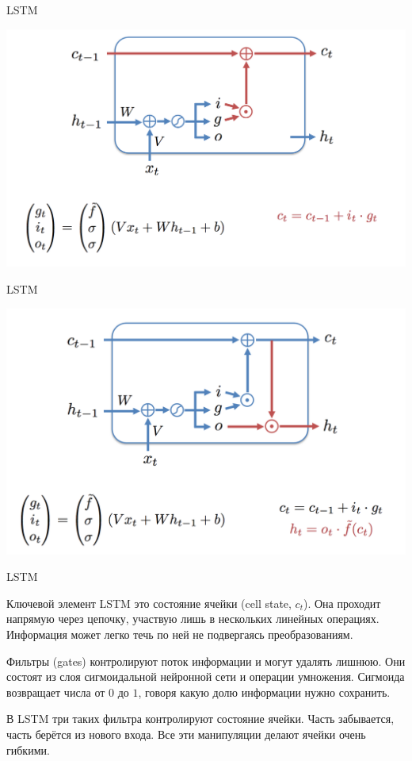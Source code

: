 \documentclass[notes,12pt, aspectratio=169]{beamer}
\newenvironment{wideitemize}{\itemize\addtolength{\itemsep}{10pt}}{\enditemize}
\begin{document}
\begin{frame}{LSTM}
\begin{center}
	\includegraphics[width=.8\linewidth]{lstm5.png}
\end{center}
\end{frame}


\begin{frame}{LSTM}
\begin{center}
	\includegraphics[width=.8\linewidth]{lstm6.png}
\end{center}
\end{frame}


\begin{frame}{LSTM}
\begin{wideitemize}
	\item  Ключевой элемент LSTM это состояние ячейки (cell state, $c_t$). Она проходит напрямую через цепочку, участвую лишь в нескольких линейных операциях. Информация может легко течь по ней не подвергаясь преобразованиям. 
	
	\item Фильтры (gates) контролируют поток информации и могут удалять лишнюю. Они состоят из слоя сигмоидальной нейронной сети и операции умножения. Сигмоида возвращает числа от $0$ до $1$, говоря какую долю информации нужно сохранить. 
	
	\item В LSTM три таких фильтра контролируют состояние ячейки. Часть забывается, часть берётся из нового входа. Все эти манипуляции делают ячейки очень гибкими. 
\end{wideitemize}
\end{frame}
\end{document}
